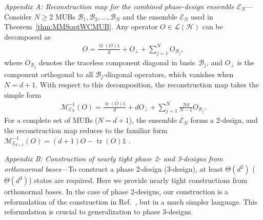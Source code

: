 \documentclass[aps,pra,twocolumn,nofootinbib,superscriptaddress,10pt]{revtex4-2}
\DeclareMathOperator{\tr}{tr}
\newcommand{\bbone}{\mathds{1}}
\newcommand{\caB}{\mathcal{B}}
\newcommand{\caE}{\mathcal{E}}
\newcommand{\caH}{\mathcal{H}}
\newcommand{\caL}{\mathcal{L}}
\newcommand{\caM}{\mathcal{M}}
\newcommand{\thref}[1]{Theorem~\ref{#1}}
\newcommand{\rcite}[1]{Ref.~\cite{#1}}
\begin{document}
\emph{Appendix A: Reconstruction map for the combined phase-design ensemble $\caE_N$}---Consider $N\geq 2$ MUBs $\caB_1,\caB_2,\ldots,\caB_N$ and the ensemble $\caE_N$ used in \thref{thm:MMSoptWCMUB}. Any operator $O\in\caL(\caH)$ can be decomposed as
\begin{align}
	O = \frac{\tr(O)\bbone}{d} + O_\perp + \sum_{j=1}^{N} O_{\caB_j},
\end{align}
where $O_{\caB_j}$ denotes the traceless component diagonal in basis~$\caB_j$, and $O_\perp$ is the component orthogonal to all $\caB_j$-diagonal operators, which vanishes when $N=d+1$. With respect to this decomposition, the reconstruction map takes the simple form
\begin{align}\label{eq:ReconMap}
	\caM_{\caE_N}^{-1}(O) = \frac{\tr(O)\bbone}{d} + dO_\perp + \sum_{j=1}^{N}\frac{Nd}{N-1}O_{\caB_j}.
\end{align}
For a complete set of MUBs ($N=d+1$), the ensemble $\caE_N$ forms a 2-design, and the reconstruction map reduces to the familiar form $\caM_{\caE_{d+1}}^{-1}(O) = (d+1)O - \tr(O)\bbone$ \cite{HuangKP20}.

\emph{Appendix B: Construction of nearly tight phase 2- and 3-designs from orthonormal bases}---To construct a phase 2-design (3-design), at least $\Theta(d^2)$ ($\Theta(d^3)$) states are required. Here we provide nearly tight constructions from orthonormal bases. In the case of phase 2-designs, our construction is a reformulation of the construction in \rcite{Gross07}, but in a much simpler language. This reformulation is crucial to generalization to phase 3-designs.
\end{document}
